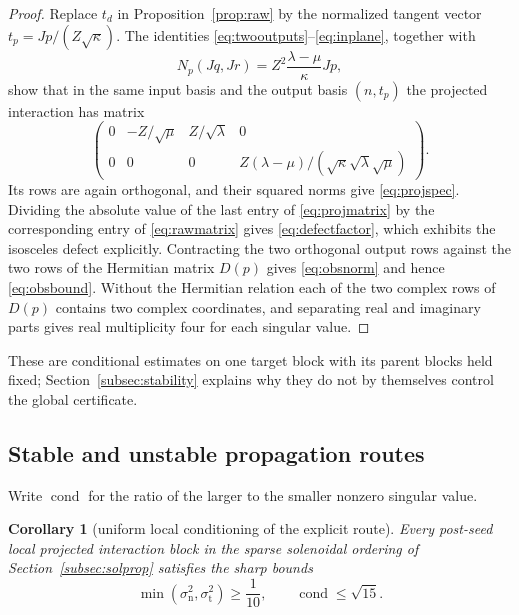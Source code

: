 \documentclass[11pt]{article}
\newtheorem{corollary}[theorem]{Corollary}
\theoremstyle{definition}
\theoremstyle{remark}
\theoremstyle{plain}
\DeclareMathOperator{\cond}{cond}
\begin{document}
\begin{proof}
Replace $t_{d}$ in Proposition~\ref{prop:raw} by the normalized tangent vector
$t_{p}=Jp/(Z\sqrt\kappa)$. The identities
\eqref{eq:twooutputs}--\eqref{eq:inplane}, together with
\[
N_{p}(Jq,Jr)=Z^{2}\frac{\lambda-\mu}{\kappa}Jp ,
\]
show that in the same input basis and the output basis $(n,t_{p})$ the
projected interaction has matrix
\begin{equation}
\label{eq:projmatrix}
\begin{pmatrix}
0&-Z/\sqrt\mu&Z/\sqrt\lambda&0\\
0&0&0&Z(\lambda-\mu)/(\sqrt\kappa\sqrt\lambda\sqrt\mu)
\end{pmatrix}.
\end{equation}
Its rows are again orthogonal, and their squared norms give
\eqref{eq:projspec}. Dividing the absolute value of the last entry of
\eqref{eq:projmatrix} by the corresponding entry of \eqref{eq:rawmatrix} gives
\eqref{eq:defectfactor}, which exhibits the isosceles defect explicitly.
Contracting the two orthogonal output rows against the two rows of the
Hermitian matrix $D(p)$ gives \eqref{eq:obsnorm} and hence
\eqref{eq:obsbound}. Without the Hermitian relation each of the two complex
rows of $D(p)$ contains two complex coordinates, and separating real and
imaginary parts gives real multiplicity four for each singular value.
\end{proof}

These are conditional estimates on one target block with its parent blocks
held fixed; Section~\ref{subsec:stability} explains why they do not by
themselves control the global certificate.

\subsection{Stable and unstable propagation routes}
\label{subsec:routes}

Write $\cond$ for the ratio of the larger to the smaller nonzero singular
value.

\begin{corollary}[uniform local conditioning of the explicit route]
\label{cor:conditioning}
Every post-seed local projected interaction block in the sparse solenoidal
ordering of Section~\ref{subsec:solprop} satisfies the sharp bounds
\begin{equation}
\label{eq:sharpcond}
\min(\sigma_{\mathrm n}^{2},\sigma_{\mathrm t}^{2})\ge\frac1{10},
\qquad
\cond\le\sqrt{15} .
\end{equation}
\end{corollary}
\end{document}
